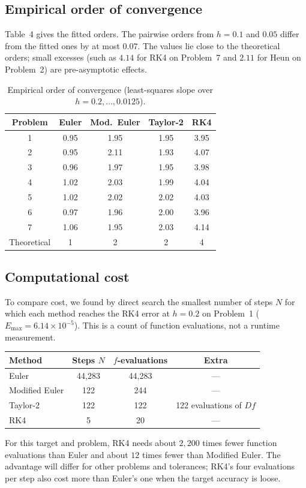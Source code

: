 \documentclass[10pt,letterpaper]{article}
\begin{document}
\subsection{Empirical order of convergence}
Table~4 gives the fitted orders. The pairwise orders from $h=0.1$ and $0.05$ differ from the fitted ones by at most $0.07$. The values lie close to the theoretical orders; small excesses (such as $4.14$ for RK4 on Problem~7 and $2.11$ for Heun on Problem~2) are pre-asymptotic effects.

\begin{table}[H]\centering
\caption{Empirical order of convergence (least-squares slope over $h=0.2,\dots,0.0125$).}
\begin{tabular}{@{}ccccc@{}}\toprule
Problem & Euler & Mod.\ Euler & Taylor-2 & RK4\\\midrule
1 & 0.95 & 1.95 & 1.95 & 3.95 \\
2 & 0.95 & 2.11 & 1.93 & 4.07 \\
3 & 0.96 & 1.97 & 1.95 & 3.98 \\
4 & 1.02 & 2.03 & 1.99 & 4.04 \\
5 & 1.02 & 2.02 & 2.02 & 4.03 \\
6 & 0.97 & 1.96 & 2.00 & 3.96 \\
7 & 1.06 & 1.95 & 2.03 & 4.14\\
\midrule
Theoretical & 1 & 2 & 2 & 4\\\bottomrule
\end{tabular}
\end{table}

\subsection{Computational cost}
To compare cost, we found by direct search the smallest number of steps $N$ for which each method reaches the RK4 error at $h=0.2$ on Problem~1 ($E_{\max}=6.14\times10^{-5}$). This is a count of function evaluations, not a runtime measurement.
\begin{center}
\begin{tabular}{@{}lccc@{}}\toprule
Method & Steps $N$ & $f$-evaluations & Extra\\\midrule
Euler & 44,283 & 44,283 & ---\\
Modified Euler & 122 & 244 & ---\\
Taylor-2 & 122 & 122 & 122 evaluations of $Df$\\
RK4 & 5 & 20 & ---\\\bottomrule
\end{tabular}
\end{center}
For this target and problem, RK4 needs about $2{,}200$ times fewer function evaluations than Euler and about $12$ times fewer than Modified Euler. The advantage will differ for other problems and tolerances; RK4's four evaluations per step also cost more than Euler's one when the target accuracy is loose.
\end{document}
